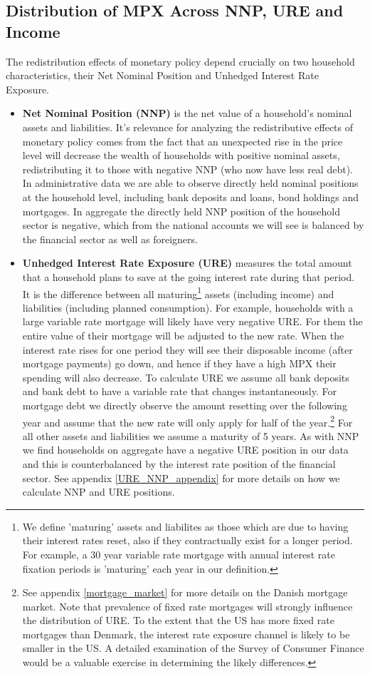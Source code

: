 \documentclass[titlepage]{\econtex}\newcommand{\texname}{ConsumptionHeterogeneity}
\begin{document}
\subsection{Distribution of MPX Across NNP, URE and Income}
The redistribution effects of monetary policy depend crucially on two household characteristics, their Net Nominal Position and Unhedged Interest Rate Exposure.
\begin{itemize}
	\item \textbf{Net Nominal Position (NNP)} is the net value of a household's nominal assets and liabilities. It's relevance for analyzing the redistributive effects of monetary policy comes from the fact that an unexpected rise in the price level will decrease the wealth of households with positive nominal assets, redistributing it to those with negative NNP (who now have less real debt). In administrative data we are able to observe directly held nominal positions at the household level, including bank deposits and loans, bond holdings and mortgages. In aggregate the directly held NNP position of the household sector is negative, which from the national accounts we will see is balanced by the financial sector as well as foreigners.
	\item \textbf{Unhedged Interest Rate Exposure (URE)} measures the total amount that a household plans to save at the going interest rate during that period. It is the difference between all maturing\footnote{We define 'maturing' assets and liabilites as those which are due to having their interest rates reset, also if they contractually exist for a longer period. For example, a 30 year variable rate mortgage with annual interest rate fixation periods is 'maturing' each year in our definition.} assets (including income) and liabilities (including planned consumption). For example, households with a large variable rate mortgage will likely have very negative URE. For them the entire value of their mortgage will be adjusted to the new rate. When the interest rate rises for one period they will see their disposable income (after mortgage payments) go down, and hence if they have a high MPX their spending will also decrease. To calculate URE we assume all bank deposits and bank debt to have a variable rate that changes instantaneously. For mortgage debt we directly observe the amount resetting over the following year and assume that the new rate will only apply for half of the year.\footnote{See appendix \ref{mortgage_market} for more details on the Danish mortgage market. Note that prevalence of fixed rate mortgages will strongly influence the distribution of URE. To the extent that the US has more fixed rate mortgages than Denmark, the interest rate exposure channel is likely to be smaller in the US. A detailed examination of the Survey of Consumer Finance would be a valuable exercise in determining the likely differences.} For all other assets and liabilities we assume a maturity of 5 years. As with NNP we find households on aggregate have a negative URE position in our data and this is counterbalanced by the interest rate position of the financial sector. See appendix \ref{URE_NNP_appendix} for more details on how we calculate NNP and URE positions.
\end{itemize}
\end{document}
